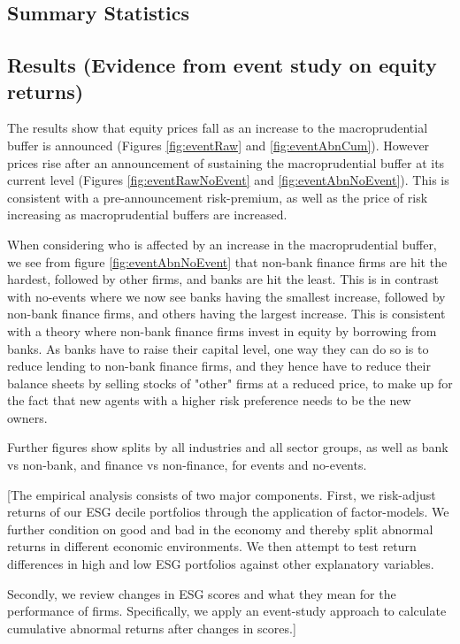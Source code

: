 \documentclass[11pt]{article}
\begin{document}
\subsection{Summary Statistics}



\subsection{Results (Evidence from event study on equity returns)}

The results show that equity prices fall as an increase to the macroprudential buffer is announced (Figures \ref{fig:eventRaw} and \ref{fig:eventAbnCum}). However prices rise after an announcement of sustaining the macroprudential buffer at its current level (Figures \ref{fig:eventRawNoEvent} and \ref{fig:eventAbnNoEvent}). This is consistent with a pre-announcement risk-premium, as well as the price of risk increasing as macroprudential buffers are increased.

When considering who is affected by an increase in the macroprudential buffer, we see from figure \ref{fig:eventAbnNoEvent} that non-bank finance firms are hit the hardest, followed by other firms, and banks are hit the least. This is in contrast with no-events where we now see banks having the smallest increase, followed by non-bank finance firms, and others having the largest increase. This is consistent with a theory where non-bank finance firms invest in equity by borrowing from banks. As banks have to raise their capital level, one way they can do so is to reduce lending to non-bank finance firms, and they hence have to reduce their balance sheets by selling stocks of "other" firms at a reduced price, to make up for the fact that new agents with a higher risk preference needs to be the new owners. 

Further figures show splits by all industries and all sector groups, as well as bank vs non-bank, and finance vs non-finance, for events and no-events.

[The empirical analysis consists of two major components. First, we risk-adjust returns of our ESG decile portfolios through the application of factor-models. We further condition on good and bad in the economy and thereby split abnormal returns in different economic environments. We then attempt to test return differences in high and low ESG portfolios against other explanatory variables. 

Secondly, we review changes in ESG scores and what they mean for the performance of firms. Specifically, we apply an event-study approach to calculate cumulative abnormal returns after changes in scores.]
\end{document}
